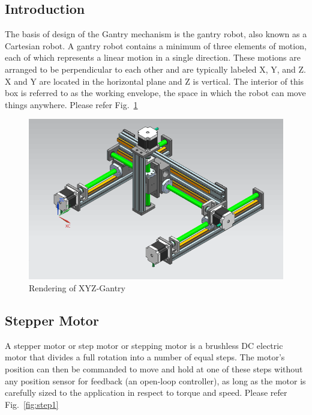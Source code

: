 \documentclass[MTech]{iitmdiss}
\begin{document}
\subsection{Introduction}
The basis of design of the Gantry mechanism is the gantry robot, also known as a Cartesian robot. A gantry robot contains a minimum of three elements of motion, each of which represents a linear motion in a single direction. These motions are arranged to be perpendicular to each other and are typically labeled X, Y, and Z. X and Y are located in the horizontal plane and Z is vertical. The interior of this box is referred to as the working envelope, the space in which the robot can move things anywhere. Please refer Fig.~\ref{fig:gant}

\begin{figure}
	\includegraphics[width=\linewidth]{ffigures/gantry}
	\caption{Rendering of XYZ-Gantry}
	\label{fig:gant}
\end{figure}

\subsection{Stepper Motor}

A stepper motor or step motor or stepping motor is a brushless DC electric motor that divides a full rotation into a number of equal steps. The motor's position can then be commanded to move and hold at one of these steps without any position sensor for feedback (an open-loop controller), as long as the motor is carefully sized to the application in respect to torque and speed. Please refer Fig.~\ref{fig:step1}
\end{document}
